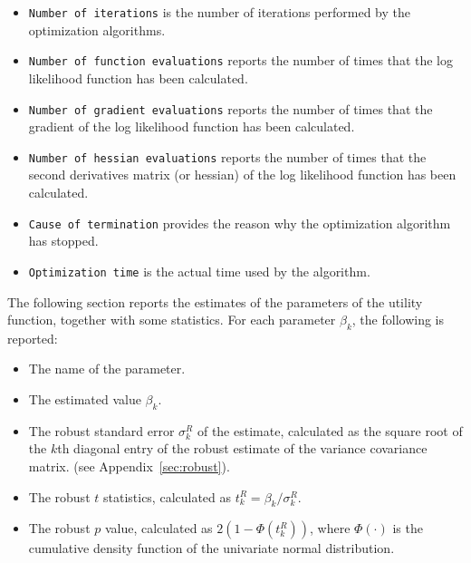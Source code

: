 \documentclass[12pt,a4paper]{article}
\begin{document}
\begin{itemize}
         \item \texttt{Number of iterations} is the number of
           iterations performed by the optimization algorithms.
         \item \texttt{Number of function evaluations} reports the
           number of times that the log likelihood function has been
           calculated.
         \item \texttt{Number of gradient evaluations} reports the
           number of times that the gradient of the log likelihood function has been
           calculated.
         \item \texttt{Number of hessian evaluations} reports the
           number of times that the second derivatives matrix (or
           hessian) of the log likelihood function has been
           calculated.
         \item \texttt{Cause of termination} provides the reason why
           the optimization algorithm has stopped. 
         \item \texttt{Optimization time} is the actual time used by the algorithm.
   \end{itemize}


The following section reports the estimates of the parameters of the
utility function,
together with some statistics. For each parameter $\beta_k$, the following is reported:
   \begin{itemize}
  \item The name of the parameter.
      \item The estimated value $\beta_k$. 
      \item The robust standard error $\sigma^R_k$ of the estimate, calculated as the
         square root of the $k$th diagonal entry of the
         robust estimate of the variance covariance matrix. (see Appendix~\ref{sec:robust}).
     \item The robust $t$ statistics, calculated as $t^R_k=\beta_k/\sigma^R_k$.
     \item The robust $p$ value, calculated as $2 (1 - \Phi(t^R_k))$,
where $\Phi(\cdot)$ is the cumulative density function of the
univariate normal distribution. 
   \end{itemize}
\end{document}

